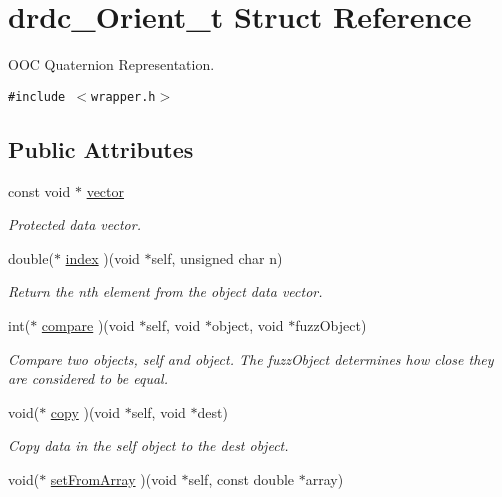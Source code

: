 \hypertarget{structdrdc__Orient__t}{
\section{drdc\_\-Orient\_\-t Struct Reference}
\label{structdrdc__Orient__t}
}
OOC Quaternion Representation.  


{\tt \#include $<$wrapper.h$>$}

\subsection*{Public Attributes}
\begin{CompactItemize}
\item 
const void $\ast$ \hyperlink{structdrdc__Orient__t_1c7f7a1cc0c16797a0f7fbce6d3b1c99}{vector}
\begin{CompactList}\small\item\em Protected data vector. \item\end{CompactList}\item 
double($\ast$ \hyperlink{structdrdc__Orient__t_7d099087aa69fc1aedffd77f7744c441}{index} )(void $\ast$self, unsigned char n)
\begin{CompactList}\small\item\em Return the nth element from the object data vector. \item\end{CompactList}\item 
int($\ast$ \hyperlink{structdrdc__Orient__t_bc95816c336a44ee2ed6a3e739070971}{compare} )(void $\ast$self, void $\ast$object, void $\ast$fuzzObject)
\begin{CompactList}\small\item\em Compare two objects, self and object. The fuzzObject determines how close they are considered to be equal. \item\end{CompactList}\item 
void($\ast$ \hyperlink{structdrdc__Orient__t_33504e9b07aebd96d0b3792acfc13d99}{copy} )(void $\ast$self, void $\ast$dest)
\begin{CompactList}\small\item\em Copy data in the self object to the dest object. \item\end{CompactList}\item 
void($\ast$ \hyperlink{structdrdc__Orient__t_08c035799b9a3a3095b93a230dde7373}{setFromArray} )(void $\ast$self, const double $\ast$array)

\end{CompactItemize}
